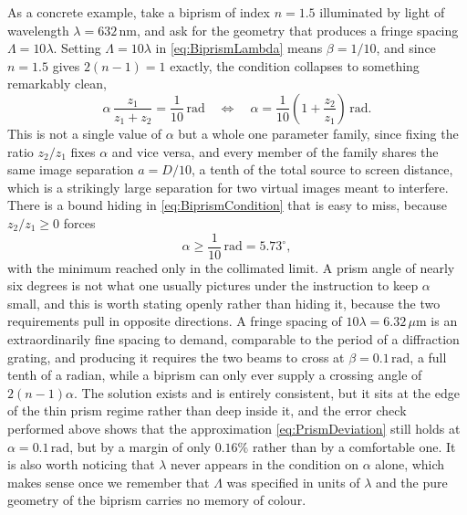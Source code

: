         As a concrete example, take a biprism of index $n=1.5$ illuminated by light of wavelength $\lambda = 632\,\text{nm}$, and ask for the geometry that produces a fringe spacing $\Lambda = 10\lambda$. Setting $\Lambda = 10\lambda$ in \ref{eq:BiprismLambda} means $\beta = 1/10$, and since $n=1.5$ gives $2(n-1)=1$ exactly, the condition collapses to something remarkably clean,
        \begin{equation}\label{eq:BiprismCondition}
            \alpha\,\frac{z_1}{z_1+z_2} = \frac{1}{10}\,\text{rad} \quad\Longleftrightarrow\quad \alpha = \frac{1}{10}\left(1+\frac{z_2}{z_1}\right)\,\text{rad}.
        \end{equation}
        This is not a single value of $\alpha$ but a whole one parameter family, since fixing the ratio $z_2/z_1$ fixes $\alpha$ and vice versa, and every member of the family shares the same image separation $a = D/10$, a tenth of the total source to screen distance, which is a strikingly large separation for two virtual images meant to interfere. There is a bound hiding in \ref{eq:BiprismCondition} that is easy to miss, because $z_2/z_1 \geq 0$ forces
        \begin{equation}\label{eq:BiprismBound}
            \alpha \geq \frac{1}{10}\,\text{rad} = 5.73^\circ,
        \end{equation}
        with the minimum reached only in the collimated limit. A prism angle of nearly six degrees is not what one usually pictures under the instruction to keep $\alpha$ small, and this is worth stating openly rather than hiding it, because the two requirements pull in opposite directions. A fringe spacing of $10\lambda = 6.32\,\mu\text{m}$ is an extraordinarily fine spacing to demand, comparable to the period of a diffraction grating, and producing it requires the two beams to cross at $\beta = 0.1\,\text{rad}$, a full tenth of a radian, while a biprism can only ever supply a crossing angle of $2(n-1)\alpha$. The solution exists and is entirely consistent, but it sits at the edge of the thin prism regime rather than deep inside it, and the error check performed above shows that the approximation \ref{eq:PrismDeviation} still holds at $\alpha = 0.1\,\text{rad}$, but by a margin of only $0.16\%$ rather than by a comfortable one. It is also worth noticing that $\lambda$ never appears in the condition on $\alpha$ alone, which makes sense once we remember that $\Lambda$ was specified in units of $\lambda$ and the pure geometry of the biprism carries no memory of colour.

